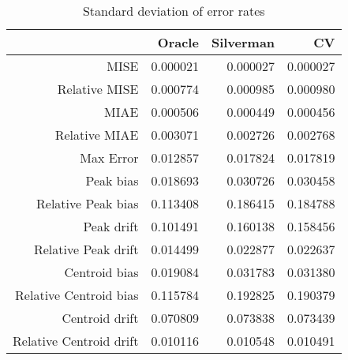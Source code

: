 \begin{table}[ht]
\centering
\begin{tabular}{rrrr}
  \hline
 & Oracle & Silverman & CV \\ 
  \hline
MISE & 0.000021 & 0.000027 & 0.000027 \\ 
  Relative MISE & 0.000774 & 0.000985 & 0.000980 \\ 
  MIAE & 0.000506 & 0.000449 & 0.000456 \\ 
  Relative MIAE & 0.003071 & 0.002726 & 0.002768 \\ 
  Max Error & 0.012857 & 0.017824 & 0.017819 \\ 
  Peak bias & 0.018693 & 0.030726 & 0.030458 \\ 
  Relative Peak bias & 0.113408 & 0.186415 & 0.184788 \\ 
  Peak drift & 0.101491 & 0.160138 & 0.158456 \\ 
  Relative Peak drift & 0.014499 & 0.022877 & 0.022637 \\ 
  Centroid bias & 0.019084 & 0.031783 & 0.031380 \\ 
  Relative Centroid bias & 0.115784 & 0.192825 & 0.190379 \\ 
  Centroid drift & 0.070809 & 0.073838 & 0.073439 \\ 
  Relative Centroid drift & 0.010116 & 0.010548 & 0.010491 \\ 
   \hline
\end{tabular}
\caption{Standard deviation of error rates} 
\label{tbl:stddev_error_rates}
\end{table}
